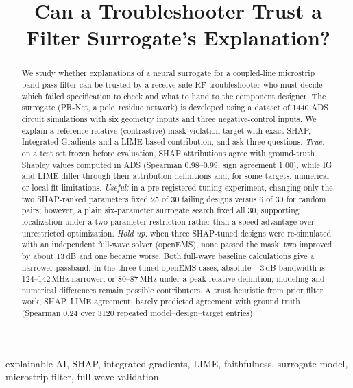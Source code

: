 \documentclass[conference,10pt]{IEEEtran}
\begin{document}
\title{Can a Troubleshooter Trust a Filter Surrogate's Explanation?}

\author{
}

\maketitle

\begin{abstract}
We study whether explanations of a neural surrogate for a coupled-line microstrip band-pass filter can be trusted by a receive-side RF troubleshooter who must decide which failed specification to check and what to hand to the component designer.
The surrogate (PR-Net, a pole--residue network) is developed using a dataset of 1440 ADS circuit simulations with six geometry inputs and three negative-control inputs.
We explain a reference-relative (contrastive) mask-violation target with exact SHAP, Integrated Gradients and a LIME-based contribution, and ask three questions.
\emph{True:} on a test set frozen before evaluation, SHAP attributions agree with ground-truth Shapley values computed in ADS (Spearman 0.98--0.99, sign agreement 1.00), while IG and LIME differ through their attribution definitions and, for some targets, numerical or local-fit limitations.
\emph{Useful:} in a pre-registered tuning experiment, changing only the two SHAP-ranked parameters fixed 25 of 30 failing designs versus 6 of 30 for random pairs; however, a plain six-parameter surrogate search fixed all 30, supporting localization under a two-parameter restriction rather than a speed advantage over unrestricted optimization.
\emph{Hold up:} when three SHAP-tuned designs were re-simulated with an independent full-wave solver (openEMS), none passed the mask; two improved by about 13\,dB and one became worse.
Both full-wave baseline calculations give a narrower passband. In the three tuned openEMS cases, absolute $-3$\,dB bandwidth is 124--142\,MHz narrower, or 80--87\,MHz under a peak-relative definition; modeling and numerical differences remain possible contributors.
A trust heuristic from prior filter work, SHAP--LIME agreement, barely predicted agreement with ground truth (Spearman 0.24 over 3120 repeated model--design--target entries).
\end{abstract}

\begin{IEEEkeywords}
explainable AI, SHAP, integrated gradients, LIME, faithfulness, surrogate model, microstrip filter, full-wave validation
\end{IEEEkeywords}
\end{document}
